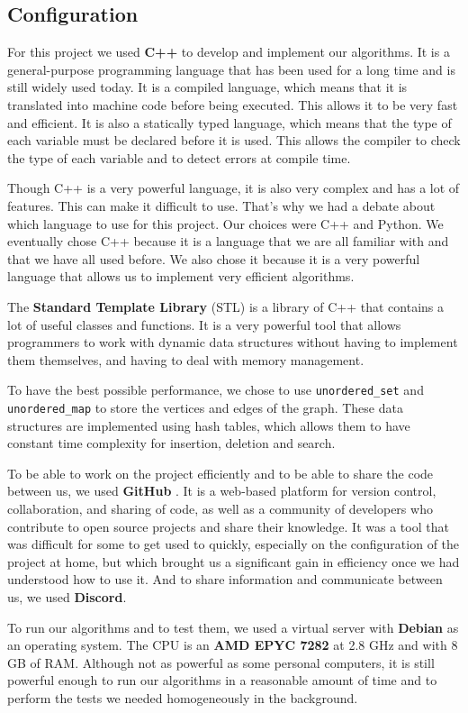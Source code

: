 \subsection{Configuration}

For this project we used \textbf{C++} to develop and implement our algorithms. 
It is a general-purpose programming language that has been used for a long time 
and is still widely used today. It is a compiled language, which means that it 
is translated into machine code before being executed. This allows it to be very 
fast and efficient. It is also a statically typed language, which means that the 
type of each variable must be declared before it is used. This allows the compiler 
to check the type of each variable and to detect errors at compile time. \bigskip

Though C++ is a very powerful language, it is also very complex and has a lot of
features. This can make it difficult to use. That's why we had a debate about
which language to use for this project. Our choices were C++ and Python. We
eventually chose C++ because it is a language that we are all familiar with and
that we have all used before. We also chose it because it is a very powerful
language that allows us to implement very efficient algorithms. \bigskip

The \textbf{Standard Template Library} (STL) is a library of C++ that contains 
a lot of useful classes and functions. It is a very powerful tool that allows 
programmers to work with dynamic data structures without having to implement 
them themselves, and having to deal with memory management. \bigskip

To have the best possible performance, we chose to use \texttt{unordered\_set}
and \texttt{unordered\_map} to store the vertices and edges of the graph. These
data structures are implemented using hash tables, which allows them to have
constant time complexity for insertion, deletion and search. \bigskip

To be able to work on the project efficiently and to be able to share the code
between us, we used \textbf{GitHub}\footnotemark 
{}.
It is a web-based platform for version control, collaboration, and sharing of
code, as well as a community of developers who contribute to open source projects
and share their knowledge. It was a tool that was difficult for some to get used
to quickly, especially on the configuration of the project at home, but which
brought us a significant gain in efficiency once we had understood how to use it.
And to share information and communicate between us, we used \textbf{Discord}.
\bigskip

To run our algorithms and to test them, we used a virtual server with \textbf{Debian}
as an operating system. The CPU is an \textbf{AMD EPYC 7282} at 2.8 GHz and with
8 GB of RAM. Although not as powerful as some personal computers, it is still
powerful enough to run our algorithms in a reasonable amount of time and to
perform the tests we needed homogeneously in the background. \bigskip 